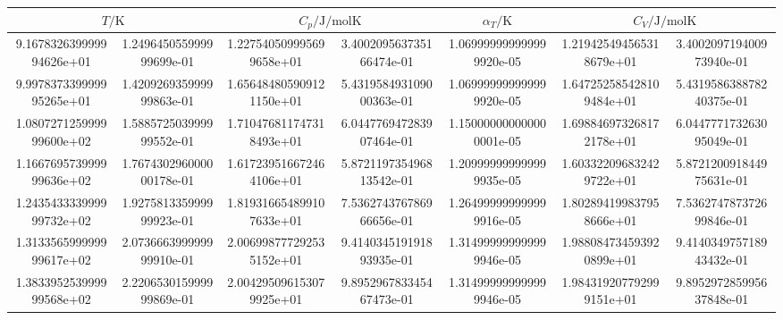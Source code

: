 \begin{table}
  \centering
  \begin{tabular}{  
S[round-mode = places , round-precision = 1,scientific-notation=fixed, fixed-exponent = 0]
@{${}\pm \quad$} 
S[round-mode = places , round-precision = 1,scientific-notation=fixed, fixed-exponent = 0]
S[round-mode = places , round-precision = 0,scientific-notation=fixed, fixed-exponent = 0]
@{${}\pm{}$} 
S[round-mode = places , round-precision = 0] 
S[round-mode = places , round-precision = 2,scientific-notation=fixed, fixed-exponent = -6 ] 
S[round-mode = places , round-precision = 0,scientific-notation=fixed, fixed-exponent = 0]
@{${}\pm{}$} 
S[round-mode = places , round-precision = 0] 
}
    \toprule
      & 
    & 
    $\alpha_T / \si{\kelvin}$ & 
    \\
    \midrule
9.167832639999994626e+01 & 1.249645055999999699e-01 & 1.227540509995699658e+01 & 3.400209563735166474e-01 & 1.069999999999999920e-05 & 1.219425494565318679e+01 & 3.400209719400973940e-01\\
9.997837339999995265e+01 & 1.420926935999999863e-01 & 1.656484805909121150e+01 & 5.431958493109000363e-01 & 1.069999999999999920e-05 & 1.647252585428109484e+01 & 5.431958638878240375e-01\\
1.080727125999999600e+02 & 1.588572503999999552e-01 & 1.710476811747318493e+01 & 6.044776947283907464e-01 & 1.150000000000000001e-05 & 1.698846973268172178e+01 & 6.044777173263095049e-01\\
1.166769573999999636e+02 & 1.767430296000000178e-01 & 1.617239516672464106e+01 & 5.872119735496813542e-01 & 1.209999999999999935e-05 & 1.603322096832429722e+01 & 5.872120091844975631e-01\\
1.243543333999999732e+02 & 1.927581335999999923e-01 & 1.819316654899107633e+01 & 7.536274376786966656e-01 & 1.264999999999999916e-05 & 1.802894199837958666e+01 & 7.536274787372699846e-01\\
1.313356599999999617e+02 & 2.073666399999999910e-01 & 2.006998777292535152e+01 & 9.414034519191893935e-01 & 1.314999999999999946e-05 & 1.988084734593920899e+01 & 9.414034975718943432e-01\\
1.383395253999999568e+02 & 2.220653015999999869e-01 & 2.004295096153079925e+01 & 9.895296783345467473e-01 & 1.314999999999999946e-05 & 1.984319207792999151e+01 & 9.895297285995637848e-01\\

\end{tabular}
\end{table}
